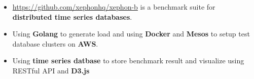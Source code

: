 \documentclass[10pt, letterpaper]{simple-cv}
\begin{document}
\begin{itemize}
\item \url{https://github.com/xephonhq/xephon-b} is a benchmark suite for \textbf{distributed time series databases}.
\item Using \textbf{Golang} to generate load and using \textbf{Docker} and \textbf{Mesos} to setup test database clusters on \textbf{AWS}.
\item Using \textbf{time series datbase} to store benchmark result and visualize using RESTful API and \textbf{D3.js}
\end{itemize}

\end{document}
